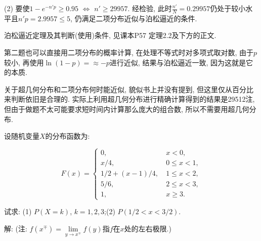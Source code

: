 \documentclass[standard]{ExBook}
\begin{document}
\begin{qitems}
\vspace{-5em}

    \begin{bbox}
(2) 要使$1-e^{-n'p}\geq0.95$ $\Longleftrightarrow$ $n'\geq29957$. 经检验, 此时$\frac{n'}{N}=0.29957$仍处于较小水平且$n'p=2.9957 \leq 5$, 仍满足二项分布近似与泊松逼近的条件.

\textcolor{themeColor}{\selectfont {} 泊松逼近定理及其判断(使用)条件, 见课本P57 定理2.2及下方的正文.}

\textcolor{themeColor}{\selectfont {} 第二题也可以直接用二项分布的概率计算, 在处理不等式时对多项式取对数, 由于$p$较小, 再使用$\ln(1-p)=\approx-p$进行近似, 结果与泊松逼近一致, 因为这就是它的本质.}

\textcolor{themeColor}{\selectfont {} 关于超几何分布和二项分布何时能近似, 貌似书上并没有提到, 但这里仅从百分比来判断依旧是合理的. 实际上利用超几何分布进行精确计算得到的结果是29512注, 但由于做题不太可能要求短时间内计算那么庞大的组合数, 所以不需要用超几何分布.} 
    \end{bbox}

\vspace{-5em}

    \begin{bbox}
    \begin{shaded}
        \qitem
设随机变量$X$的分布函数为:
\vspace{-2em}
\begin{center}
\begin{equation}
    F(x)=
    \left\{
    \begin{array}{cl}
        \nonumber
        0,\ &x < 0,\\
        x/4,\ &0 \leq x < 1,\\
        1/2+(x-1)/4,\ &1 \leq x < 2,\\
        5/6,\ &2 \leq x <3,\\
        1,\ &x \geq 3.
    \end{array}
    \right.
\end{equation}
\end{center}
试求: (1) $P(X=k)$, $k=1,2,3$;\qquad(2) $P(1/2<x<3/2)$.
    \end{shaded}
    \end{bbox}

\vspace{-5em}

    \begin{bbox}
解: (注: $f(x^\mp)=\lim\limits_{y\to x^\mp}f(y)$指$f$在$x$处的左右极限.)


\end{bbox}
\end{qitems}
\end{document}
